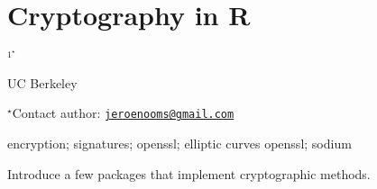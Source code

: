 \documentclass[\main/boa.tex]{subfiles}
\begin{document}
\section{Cryptography in R}

\begin{center}
  {\bf {}$^{1^\star}$}
\end{center}

\vskip 0.3cm

\begin{affiliations}
\begin{enumerate}
\begin{minipage}{0.915\textwidth}
\centering
\item UC Berkeley \\[-2pt]
\end{minipage}
\end{enumerate}
$^\star$Contact author: \href{mailto:jeroenooms@gmail.com}{\nolinkurl{jeroenooms@gmail.com}}\\
\end{affiliations}

\vskip 0.5cm

\begin{minipage}{0.915\textwidth}
\keywords encryption; signatures; openssl; elliptic curves
\packages openssl; sodium
\end{minipage}

\vskip 0.8cm

Introduce a few packages that implement cryptographic methods.
\end{document}
